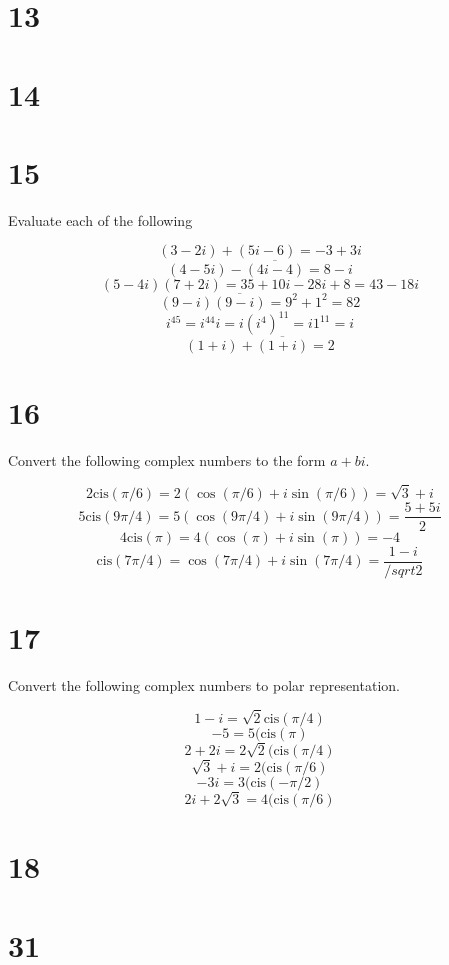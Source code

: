\documentclass[a4paper]{article}
\begin{document}
\section*{13}


\section*{14}


\section*{15}

Evaluate each of the following

$$(3-2i) + (5i-6) = -3 + 3i$$
$$(4-5i) - \overline{(4i-4)} = 8 - i$$
$$(5-4i)(7+2i) = 35 + 10i - 28i + 8 = 43 - 18i$$
$$(9-i)\overline{(9-i)} = 9^2 + 1^2 = 82$$
$$i^{45} = i^{44} i = i(i^4)^{11} = i 1^{11} = i$$
$$(1+i) + \overline{(1+i)} = 2$$


\section*{16}

Convert the following complex numbers to the form $a + bi$. 

$$2 \text{cis} (\pi/6) = 2(\cos (\pi/6) + i \sin(\pi/6)) = \sqrt{3} + i$$
$$5 \text{cis} (9\pi/4) = 5(\cos (9\pi/4) + i \sin(9\pi/4)) = \frac{5 + 5i}{2}$$
$$4 \text{cis} (\pi) = 4(\cos (\pi) + i \sin(\pi)) = -4$$
$$\text{cis} (7\pi/4) = \cos (7\pi/4) + i \sin(7\pi/4) = \frac{1-i}{/sqrt{2}}$$


\section*{17}

Convert the following complex numbers to polar representation.

$$ 1-i = \sqrt{2} \text{cis}(\pi/4)$$
$$ -5 = 5(\text{cis}(\pi)$$
$$ 2 + 2i = 2\sqrt{2}(\text{cis}(\pi/4)$$
$$ \sqrt{3} + i = 2(\text{cis}(\pi/6)$$
$$ -3i = 3(\text{cis}(-\pi/2)$$
$$ 2i + 2 \sqrt{3} = 4(\text{cis}(\pi/6)$$


\section*{18}




\section*{31}
\end{document}
